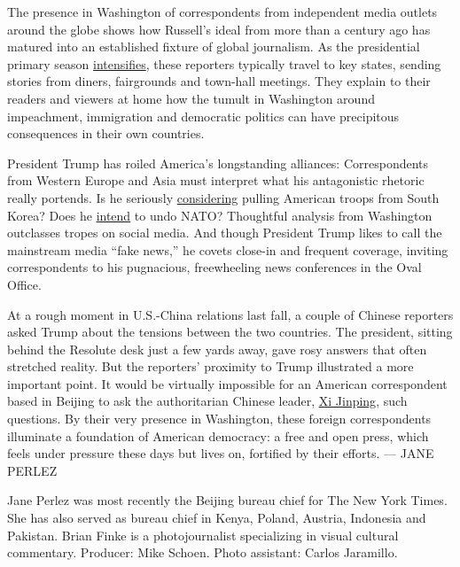 The presence in Washington of correspondents from independent media
outlets around the globe shows how Russell's ideal from more than a
century ago has matured into an established fixture of global
journalism. As the presidential primary season
\href{https://www.nytimes3xbfgragh.onion/interactive/2019/us/elections/2020-presidential-election-calendar.html}{intensifies},
these reporters typically travel to key states, sending stories from
diners, fairgrounds and town-hall meetings. They explain to their
readers and viewers at home how the tumult in Washington around
impeachment, immigration and democratic politics can have precipitous
consequences in their own countries.

President Trump has roiled America's longstanding alliances:
Correspondents from Western Europe and Asia must interpret what his
antagonistic rhetoric really portends. Is he seriously
\href{https://www.nytimes3xbfgragh.onion/2018/05/03/world/asia/trump-troops-south-korea.html}{considering}
pulling American troops from South Korea? Does he
\href{https://www.nytimes3xbfgragh.onion/2019/01/14/us/politics/nato-president-trump.html}{intend}
to undo NATO? Thoughtful analysis from Washington outclasses tropes on
social media. And though President Trump likes to call the mainstream
media ``fake news,'' he covets close-in and frequent coverage, inviting
correspondents to his pugnacious, freewheeling news conferences in the
Oval Office.

At a rough moment in U.S.-China relations last fall, a couple of Chinese
reporters asked Trump about the tensions between the two countries. The
president, sitting behind the Resolute desk just a few yards away, gave
rosy answers that often stretched reality. But the reporters' proximity
to Trump illustrated a more important point. It would be virtually
impossible for an American correspondent based in Beijing to ask the
authoritarian Chinese leader,
\href{https://www.nytimes3xbfgragh.onion/topic/person/xi-jinping}{Xi
Jinping}, such questions. By their very presence in Washington, these
foreign correspondents illuminate a foundation of American democracy: a
free and open press, which feels under pressure these days but lives on,
fortified by their efforts. --- JANE PERLEZ

Jane Perlez was most recently the Beijing bureau chief for The New York
Times. She has also served as bureau chief in Kenya, Poland, Austria,
Indonesia and Pakistan. Brian Finke is a photojournalist specializing in
visual cultural commentary. Producer: Mike Schoen. Photo assistant:
Carlos Jaramillo.

